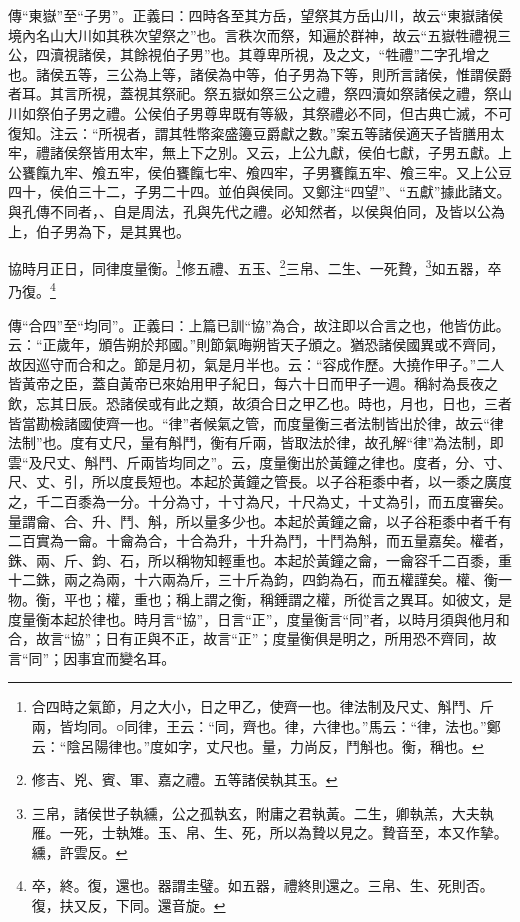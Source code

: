 {\noindent\zhuan{}\fzbyks 傳“東嶽”至“子男”。正義曰：四時各至其方岳，望祭其方岳山川，故云“東嶽諸侯境內名山大川如其秩次望祭之”也。言秩次而祭，知遍於群神，故云“五嶽牲禮視三公，四瀆視諸侯，其餘視伯子男”也。其尊卑所視，及之文，“牲禮”二字孔增之也。諸侯五等，三公為上等，諸侯為中等，伯子男為下等，則所言諸侯，惟謂侯爵者耳。其言所視，蓋視其祭祀。祭五嶽如祭三公之禮，祭四瀆如祭諸侯之禮，祭山川如祭伯子男之禮。公侯伯子男尊卑既有等級，其祭禮必不同，但古典亡滅，不可復知。注云：“所視者，謂其牲幣粢盛籩豆爵獻之數。”案五等諸侯適天子皆膳用太牢，禮諸侯祭皆用太牢，無上下之別。又云，上公九獻，侯伯七獻，子男五獻。上公饔餼九牢、飧五牢，侯伯饔餼七牢、飧四牢，子男饔餼五牢、飧三牢。又上公豆四十，侯伯三十二，子男二十四。並伯與侯同。又鄭注“四望”、“五獻”據此諸文。與孔傳不同者，、自是周法，孔與先代之禮。必知然者，以侯與伯同，及皆以公為上，伯子男為下，是其異也。 \par}

協時月正日，同律度量衡。\footnote{合四時之氣節，月之大小，日之甲乙，使齊一也。律法制及尺丈、斛鬥、斤兩，皆均同。○同律，王云：“同，齊也。律，六律也。”馬云：“律，法也。”鄭云：“陰呂陽律也。”度如字，丈尺也。量，力尚反，鬥斛也。衡，稱也。}修五禮、五玉、\footnote{修吉、兇、賓、軍、嘉之禮。五等諸侯執其玉。}三帛、二生、一死贄，\footnote{三帛，諸侯世子執纁，公之孤執玄，附庸之君執黃。二生，卿執羔，大夫執雁。一死，士執雉。玉、帛、生、死，所以為贄以見之。贄音至，本又作摯。纁，許雲反。}如五器，卒乃復。\footnote{卒，終。復，還也。器謂圭璧。如五器，禮終則還之。三帛、生、死則否。復，扶又反，下同。還音旋。}

{\noindent\zhuan{}\fzbyks 傳“合四”至“均同”。正義曰：上篇已訓“協”為合，故注即以合言之也，他皆仿此。云：“正歲年，頒告朔於邦國。”則節氣晦朔皆天子頒之。猶恐諸侯國異或不齊同，故因巡守而合和之。節是月初，氣是月半也。云：“容成作歷。大撓作甲子。”二人皆黃帝之臣，蓋自黃帝已來始用甲子紀日，每六十日而甲子一週。稱紂為長夜之飲，忘其日辰。恐諸侯或有此之類，故須合日之甲乙也。時也，月也，日也，三者皆當勘檢諸國使齊一也。“律”者候氣之管，而度量衡三者法制皆出於律，故云“律法制”也。度有丈尺，量有斛鬥，衡有斤兩，皆取法於律，故孔解“律”為法制，即雲“及尺丈、斛鬥、斤兩皆均同之”。云，度量衡出於黃鐘之律也。度者，分、寸、尺、丈、引，所以度長短也。本起於黃鐘之管長。以子谷秬黍中者，以一黍之廣度之，千二百黍為一分。十分為寸，十寸為尺，十尺為丈，十丈為引，而五度審矣。量謂龠、合、升、鬥、斛，所以量多少也。本起於黃鐘之龠，以子谷秬黍中者千有二百實為一龠。十龠為合，十合為升，十升為鬥，十鬥為斛，而五量嘉矣。權者，銖、兩、斤、鈞、石，所以稱物知輕重也。本起於黃鐘之龠，一龠容千二百黍，重十二銖，兩之為兩，十六兩為斤，三十斤為鈞，四鈞為石，而五權謹矣。權、衡一物。衡，平也；權，重也；稱上謂之衡，稱錘謂之權，所從言之異耳。如彼文，是度量衡本起於律也。時月言“協”，日言“正”，度量衡言“同”者，以時月須與他月和合，故言“協”；日有正與不正，故言“正”；度量衡俱是明之，所用恐不齊同，故言“同”；因事宜而變名耳。 \par}

